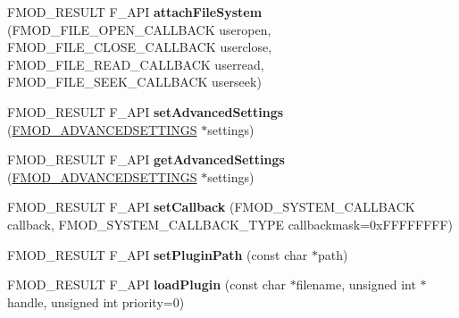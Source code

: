 \begin{DoxyCompactItemize}
\item 
\mbox{\label{classFMOD_1_1System_a1ba3740700c658162387ae161745e39a}} 
F\+M\+O\+D\+\_\+\+R\+E\+S\+U\+LT F\+\_\+\+A\+PI {\bfseries attach\+File\+System} (F\+M\+O\+D\+\_\+\+F\+I\+L\+E\+\_\+\+O\+P\+E\+N\+\_\+\+C\+A\+L\+L\+B\+A\+CK useropen, F\+M\+O\+D\+\_\+\+F\+I\+L\+E\+\_\+\+C\+L\+O\+S\+E\+\_\+\+C\+A\+L\+L\+B\+A\+CK userclose, F\+M\+O\+D\+\_\+\+F\+I\+L\+E\+\_\+\+R\+E\+A\+D\+\_\+\+C\+A\+L\+L\+B\+A\+CK userread, F\+M\+O\+D\+\_\+\+F\+I\+L\+E\+\_\+\+S\+E\+E\+K\+\_\+\+C\+A\+L\+L\+B\+A\+CK userseek)
\item 
\mbox{\label{classFMOD_1_1System_a8e7c0f550c5c540d8889fb835992cff5}} 
F\+M\+O\+D\+\_\+\+R\+E\+S\+U\+LT F\+\_\+\+A\+PI {\bfseries set\+Advanced\+Settings} (\hyperlink{structFMOD__ADVANCEDSETTINGS}{F\+M\+O\+D\+\_\+\+A\+D\+V\+A\+N\+C\+E\+D\+S\+E\+T\+T\+I\+N\+GS} $\ast$settings)
\item 
\mbox{\label{classFMOD_1_1System_a9c111315da6297cb6889aedfd46c3daa}} 
F\+M\+O\+D\+\_\+\+R\+E\+S\+U\+LT F\+\_\+\+A\+PI {\bfseries get\+Advanced\+Settings} (\hyperlink{structFMOD__ADVANCEDSETTINGS}{F\+M\+O\+D\+\_\+\+A\+D\+V\+A\+N\+C\+E\+D\+S\+E\+T\+T\+I\+N\+GS} $\ast$settings)
\item 
\mbox{\label{classFMOD_1_1System_a70f579154de7d2ba3ca958d4c83707f1}} 
F\+M\+O\+D\+\_\+\+R\+E\+S\+U\+LT F\+\_\+\+A\+PI {\bfseries set\+Callback} (F\+M\+O\+D\+\_\+\+S\+Y\+S\+T\+E\+M\+\_\+\+C\+A\+L\+L\+B\+A\+CK callback, F\+M\+O\+D\+\_\+\+S\+Y\+S\+T\+E\+M\+\_\+\+C\+A\+L\+L\+B\+A\+C\+K\+\_\+\+T\+Y\+PE callbackmask=0x\+F\+F\+F\+F\+F\+F\+F\+F)
\item 
\mbox{\label{classFMOD_1_1System_ae1a00669920caf97abb5228d2053a28a}} 
F\+M\+O\+D\+\_\+\+R\+E\+S\+U\+LT F\+\_\+\+A\+PI {\bfseries set\+Plugin\+Path} (const char $\ast$path)
\item 
\mbox{\label{classFMOD_1_1System_a046e94ca835e30f60564dbf44cfa111f}} 
F\+M\+O\+D\+\_\+\+R\+E\+S\+U\+LT F\+\_\+\+A\+PI {\bfseries load\+Plugin} (const char $\ast$filename, unsigned int $\ast$handle, unsigned int priority=0)
\item 
\mbox{\label{classFMOD_1_1System_a07ae0f13eb4b291651f34c8fa59d76ff}} 

\end{DoxyCompactItemize}
